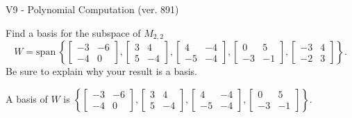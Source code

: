 \begin{exercise}
  \begin{exerciseTitle}V9 - Polynomial Computation (ver. 891)\end{exerciseTitle}
  \begin{exerciseStatement}
    Find a basis for the subspace of \(M_{2,2}\) 
\[W=\mathrm{span}\ \left\{\left[\begin{array}{cc}
-3 & -6 \\
-4 & 0
\end{array}\right] , \left[\begin{array}{cc}
3 & 4 \\
5 & -4
\end{array}\right] , \left[\begin{array}{cc}
4 & -4 \\
-5 & -4
\end{array}\right] , \left[\begin{array}{cc}
0 & 5 \\
-3 & -1
\end{array}\right] , \left[\begin{array}{cc}
-3 & 4 \\
-2 & 3
\end{array}\right]\right\}.\]
 Be sure to explain why your result is a basis.


  \end{exerciseStatement}
  \begin{exerciseAnswer}
   A basis of \(W\) is  \(\left\{\left[\begin{array}{cc}
-3 & -6 \\
-4 & 0
\end{array}\right] , \left[\begin{array}{cc}
3 & 4 \\
5 & -4
\end{array}\right] , \left[\begin{array}{cc}
4 & -4 \\
-5 & -4
\end{array}\right] , \left[\begin{array}{cc}
0 & 5 \\
-3 & -1
\end{array}\right]\right\}\).
  


  \end{exerciseAnswer}
\end{exercise}
